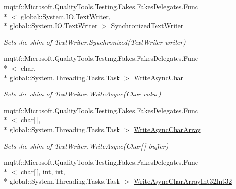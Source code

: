 \begin{DoxyCompactItemize}
mqttf\-::\-Microsoft.\-Quality\-Tools.\-Testing.\-Fakes.\-Fakes\-Delegates.\-Func\\*
$<$ global\-::\-System.\-I\-O.\-Text\-Writer, \\*
global\-::\-System.\-I\-O.\-Text\-Writer $>$ \hyperlink{class_system_1_1_i_o_1_1_fakes_1_1_shim_text_writer_a8cdc94101aae81817dec6efff138c8c0}{Synchronized\-Text\-Writer}
\begin{DoxyCompactList}\small\item\em Sets the shim of Text\-Writer.\-Synchronized(\-Text\-Writer writer)\end{DoxyCompactList}\item 
mqttf\-::\-Microsoft.\-Quality\-Tools.\-Testing.\-Fakes.\-Fakes\-Delegates.\-Func\\*
$<$ char, \\*
global\-::\-System.\-Threading.\-Tasks.\-Task $>$ \hyperlink{class_system_1_1_i_o_1_1_fakes_1_1_shim_text_writer_ad70095dc2c75fe552873edd570a1c744}{Write\-Async\-Char}
\begin{DoxyCompactList}\small\item\em Sets the shim of Text\-Writer.\-Write\-Async(\-Char value)\end{DoxyCompactList}\item 
mqttf\-::\-Microsoft.\-Quality\-Tools.\-Testing.\-Fakes.\-Fakes\-Delegates.\-Func\\*
$<$ char\mbox{[}$\,$\mbox{]}, \\*
global\-::\-System.\-Threading.\-Tasks.\-Task $>$ \hyperlink{class_system_1_1_i_o_1_1_fakes_1_1_shim_text_writer_a8bdd1c65a464c218a1a6fd3c21251f94}{Write\-Async\-Char\-Array}
\begin{DoxyCompactList}\small\item\em Sets the shim of Text\-Writer.\-Write\-Async(\-Char\mbox{[}$\,$\mbox{]} buffer)\end{DoxyCompactList}\item 
mqttf\-::\-Microsoft.\-Quality\-Tools.\-Testing.\-Fakes.\-Fakes\-Delegates.\-Func\\*
$<$ char\mbox{[}$\,$\mbox{]}, int, int, \\*
global\-::\-System.\-Threading.\-Tasks.\-Task $>$ \hyperlink{class_system_1_1_i_o_1_1_fakes_1_1_shim_text_writer_a3756e2dd03eabffb82887ebe1c0d1154}{Write\-Async\-Char\-Array\-Int32\-Int32}

\end{DoxyCompactItemize}
